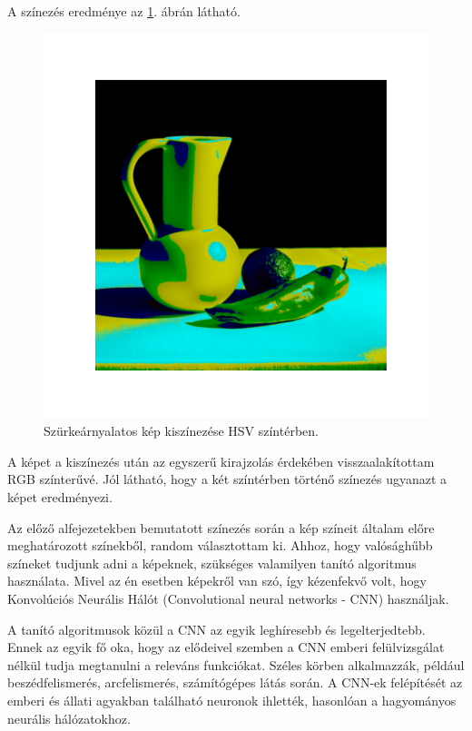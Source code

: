 A színezés eredménye az \ref{fig:colorized_hsv}. ábrán látható.

\begin{figure}[h]
\centering
\includegraphics[scale=0.7]{images/colorized_hsv.png}
\caption{Szürkeárnyalatos kép kiszínezése HSV színtérben.}
\label{fig:colorized_hsv}
\end{figure}

A képet a kiszínezés után az egyszerű kirajzolás érdekében visszaalakítottam RGB színterűvé. Jól látható, hogy a két színtérben történő színezés ugyanazt a képet eredményezi.


Az előző alfejezetekben bemutatott színezés során a kép színeit általam előre meghatározott színekből, random választottam ki. Ahhoz, hogy valósághűbb színeket tudjunk adni a képeknek, szükséges valamilyen tanító algoritmus használata.  Mivel az én esetben képekről van szó, így kézenfekvő volt, hogy Konvolúciós Neurális Hálót (Convolutional neural networks - CNN) használjak.

A tanító algoritmusok közül a CNN az egyik leghíresebb és legelterjedtebb. Ennek az egyik fő oka, hogy az elődeivel szemben a CNN emberi felülvizsgálat nélkül tudja megtanulni a releváns funkciókat. Széles körben alkalmazzák, például beszédfelismerés, arcfelismerés, számítógépes látás során. A CNN-ek felépítését az emberi és állati agyakban található neuronok ihlették, hasonlóan a hagyományos neurális hálózatokhoz.

